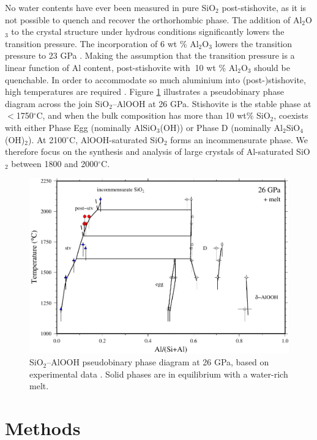 \documentclass[review]{elsarticle}
\begin{document}
No water contents have ever been measured in pure SiO$_2$ post-stishovite, as it is not possible to quench and recover the orthorhombic phase. The addition of Al$_2$O$_3$ to the crystal structure under hydrous conditions significantly lowers the transition pressure. The incorporation of 6 wt \% Al$_2$O$_3$ lowers the transition pressure to 23 GPa \citep{Lakshtanovetal2007}. Making the assumption that the transition pressure is a linear function of Al content, post-stishovite with $\>$10 wt \% Al$_2$O$_3$ should be quenchable. In order to accommodate so much aluminium into (post-)stishovite, high temperatures are required \citep{Ono1999, Pamatoetal2015}. Figure \ref{fig:phase_diagram} illustrates a pseudobinary phase diagram across the join SiO$_2$--AlOOH at 26 GPa. Stishovite is the stable phase at $<$1750$^{\circ}$C, and when the bulk composition has more than 10 wt\% SiO$_2$, coexists with either Phase Egg (nominally AlSiO$_3$(OH)) or Phase D (nominally Al$_2$SiO$_4$(OH)$_2$). At 2100$^{\circ}$C, AlOOH-saturated SiO$_2$ forms an incommensurate phase. We therefore focus on the synthesis and analysis of large crystals of Al-saturated SiO$_2$ between 1800 and 2000$^{\circ}$C.


\begin{figure}[ht!]
  \centering
  \includegraphics[width=1.0\textwidth]{figures/phase_diagram.pdf}
  \caption{SiO$_2$--AlOOH pseudobinary phase diagram at 26 GPa, based on experimental data \citep{Pamatoetal2015}. Solid phases are in equilibrium with a water-rich melt.}
  \label{fig:phase_diagram}
\end{figure}

\clearpage
\section{Methods}
\end{document}
